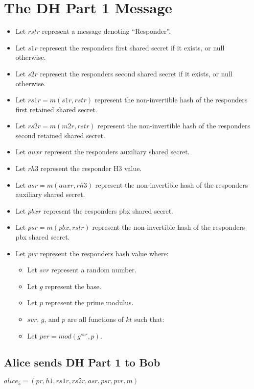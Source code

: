 \documentclass[11pt]{article}
\begin{document}
  \section*{The DH Part 1 Message}
  \begin{itemize}
    \item Let $rstr$ represent a message denoting ``Responder''.
    \item Let $s1r$ represent the responders first shared secret
          if it exists, or null otherwise.
    \item Let $s2r$ represent the responders second shared secret
          if it exists, or null otherwise.
    \item Let $rs1r = m(s1r,rstr)$ represent the non-invertible 
          hash of the responders first retained shared secret.
    \item Let $rs2r = m(m2r,rstr)$ represent the non-invertible
          hash of the responders second retained shared secret.
    \item Let $auxr$ represent the responders auxiliary shared 
          secret.
    \item Let $rh3$ represent the responder H3 value.
    \item Let $asr = m(auxr,rh3)$ represent the non-invertible hash
          of the responders auxiliary shared secret.
    \item Let $pbxr$ represent the responders pbx shared secret.
    \item Let $psr = m(pbx,rstr)$ represent the non-invertible
          hash of the responders pbx shared secret.
    \item Let $pvr$ represent the responders hash value where:
      \begin{itemize}
        \item Let $svr$ represent a random number.
        \item Let $g$ represent the base.
        \item Let $p$ represent the prime modulus.
        \item $svr$, $g$, and $p$ are all functions of $kt$
              such that: 
        \item Let $pvr = mod(g^{svr},p)$.
      \end{itemize}
  \end{itemize}
  \subsection*{Alice sends DH Part 1 to Bob}
  $alice_5=(pr,h1,rs1r,rs2r,asr,psr,pvr,m)$
\end{document}
